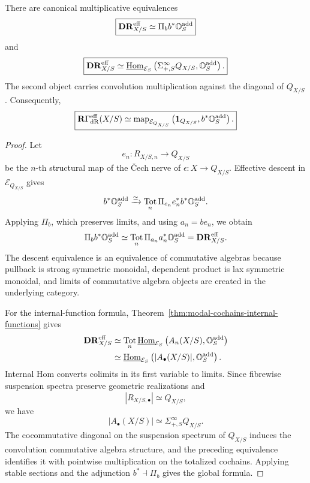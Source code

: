 \begin{theorem}
\label{thm:effective-quotient-de-rham}
There are canonical multiplicative equivalences
\[
\boxed{
    \mathbf{DR}^{\mathrm{eff}}_{X/S}
    \simeq
    \Pi_b b^*\mathbb O_S^{\mathrm{add}}
}
\]
and
\[
\boxed{
    \mathbf{DR}^{\mathrm{eff}}_{X/S}
    \simeq
    \underline{\operatorname{Hom}}_{\mathcal E_S}
    \left(
        \Sigma^\infty_{+,S}Q_{X/S},
        \mathbb O_S^{\mathrm{add}}
    \right).
}
\]
The second object carries convolution multiplication against the diagonal of \(Q_{X/S}\).
Consequently,
\[
\boxed{
    \mathbf R\Gamma_{\mathrm{dR}}^{\mathrm{eff}}(X/S)
    \simeq
    \operatorname{map}_{\mathcal E_{Q_{X/S}}}
    \left(
        \mathbf 1_{Q_{X/S}},
        b^*\mathbb O_S^{\mathrm{add}}
    \right).
}
\]
\end{theorem}

\begin{proof}
Let
\[
    e_n:R_{X/S,n}\longrightarrow Q_{X/S}
\]
be the \(n\)-th structural map of the \v{C}ech nerve of
\(\epsilon:X\to Q_{X/S}\).  Effective descent in \(\mathcal E_{Q_{X/S}}\) gives
\[
    b^*\mathbb O_S^{\mathrm{add}}
    \xrightarrow{\simeq}
    \operatorname*{Tot}_n
    \Pi_{e_n}e_n^*b^*\mathbb O_S^{\mathrm{add}}.
\]
Applying \(\Pi_b\), which preserves limits, and using \(a_n=be_n\), we obtain
\[
    \Pi_b b^*\mathbb O_S^{\mathrm{add}}
    \simeq
    \operatorname*{Tot}_n
    \Pi_{a_n}a_n^*\mathbb O_S^{\mathrm{add}}
    =
    \mathbf{DR}^{\mathrm{eff}}_{X/S}.
\]
The descent equivalence is an equivalence of commutative algebras because pullback is strong
symmetric monoidal, dependent product is lax symmetric monoidal, and limits of commutative algebra
objects are created in the underlying category.

For the internal-function formula, Theorem~\ref{thm:modal-cochains-internal-functions} gives
\[
\begin{aligned}
    \mathbf{DR}^{\mathrm{eff}}_{X/S}
    &\simeq
    \operatorname*{Tot}_n
    \underline{\operatorname{Hom}}_{\mathcal E_S}
    \left(
        A_n(X/S),\mathbb O_S^{\mathrm{add}}
    \right)
    \\
    &\simeq
    \underline{\operatorname{Hom}}_{\mathcal E_S}
    \left(
        |A_\bullet(X/S)|,\mathbb O_S^{\mathrm{add}}
    \right).
\end{aligned}
\]
Internal Hom converts colimits in its first variable to limits.  Since fibrewise suspension spectra
preserve geometric realizations and
\[
    |R_{X/S,\bullet}|\simeq Q_{X/S},
\]
we have
\[
    |A_\bullet(X/S)|
    \simeq
    \Sigma^\infty_{+,S}Q_{X/S}.
\]
The cocommutative diagonal on the suspension spectrum of \(Q_{X/S}\) induces the convolution
commutative algebra structure, and the preceding equivalence identifies it with pointwise
multiplication on the totalized cochains.  Applying stable sections and the adjunction
\(b^*\dashv\Pi_b\) gives the global formula.
\end{proof}

